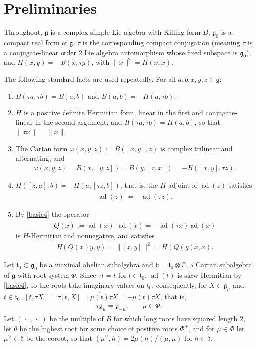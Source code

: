 \documentclass [leqno, 10pt]{amsart}
\theoremstyle{definition}
\numberwithin{equation}{section}
\newcommand{\h}{\mathfrak{h}}
\newcommand{\om}{\omega}
\newcommand{\dum}{\,\cdot\,\,}
\newcommand{\g}{\mathfrak{g}}
\newcommand{\ad}{\operatorname{ad}}
\newcommand{\com}{\mathbb C}
\newcommand{\gz}{\g_{0}}
\newcommand{\norm}[1]{\lVert #1\rVert}
\newcommand{\qad}{Q}
\begin{document}
\section{Preliminaries}\label{sec:prelim}
Throughout, $\g$ is a complex simple Lie algebra with Killing form $B$, $\gz$ is a compact real form of $\g$, $\tau$ is the corresponding compact conjugation (meaning $\tau$ is a conjugate-linear order $2$ Lie algebra automorphism whose fixed subspace is $\gz$), and $H(x, y) = -B(x, \tau y)$, with $\norm{x}^{2} = H(x, x)$.

The following standard facts are used repeatedly. For all $a, b, x, y, z \in \g$:
\begin{enumerate}
\item $B(\tau a, \tau b) = \overline{B(a, b)}$ and $B(a, b) = -H(a, \tau b)$.
\item $H$ is a positive definite Hermitian form, linear in the first and conjugate-linear in the second argument; and $H(\tau a, \tau b) = \overline{H(a, b)}$, so that $\norm{\tau x} = \norm{x}$.
\item The Cartan form $\om(x, y, z) := B([x, y], z)$ is complex trilinear and alternating, and
\begin{align}\label{eq:omegaformulas}
\om(x, y, z) = B(x, [y, z]) = B(y, [z, x]) = -H([x, y], \tau z).
\end{align}
\item $H([z, a], b) = -H(a, [\tau z, b])$; that is, the $H$-adjoint of $\ad(z)$ satisfies
\begin{align}\label{basic4}
\ad(z)^{\dagger} = -\ad(\tau z).
\end{align}

\item By \eqref{basic4} the operator
\begin{align}\label{eq:qaddefined}
\qad(x):=\ad(x)^\dagger\ad(x) = -\ad(\tau x)\ad(x)
\end{align}
is $H$-Hermitian and nonnegative, and satisfies
\begin{align}\label{basic5}
H(\qad(x)y, y) = \norm{[x, y]}^{2} = H(\qad(y)x, x).
\end{align}
\end{enumerate}

Let $\mathfrak{t}_{0} \subset \gz$ be a maximal abelian subalgebra and $\h = \mathfrak{t}_{0} \otimes \com$, a Cartan subalgebra of $\g$ with root system $\Phi$. Since $\tau t = t$ for $t \in \mathfrak{t}_{0}$, $\ad(t)$ is skew-Hermitian by \eqref{basic4}, so the roots take imaginary values on $\mathfrak{t}_{0}$; consequently, for $X \in \g_{\mu}$ and $t \in \mathfrak{t}_{0}$, $[t, \tau X] = \tau[t, X] = \overline{\mu(t)}\tau X = -\mu(t)\tau X$, that is,
\begin{align}\label{eq:tauroot}
\tau\g_{\mu} = \g_{-\mu}, \qquad \mu \in \Phi.
\end{align}
Let $(\dum, \dum)$ be the multiple of $B$ for which long roots have squared length $2$, let $\theta$ be the highest root for some choice of positive roots $\Phi^{+}$, and for $\mu \in \Phi$ let $\mu^{\vee} \in \h$ be the coroot, so that $(\mu^{\vee}, h) = 2\mu(h)/(\mu, \mu)$ for $h \in \h$. 
\end{document}
